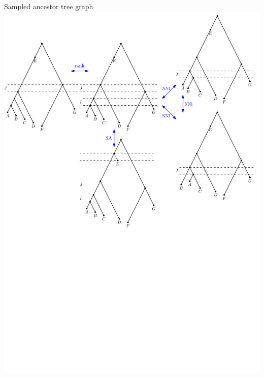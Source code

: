 \documentclass{beamer}
\begin{document}
\begin{frame}
\begin{block}{Sampled ancestor tree graph}
\includegraphics[width=0.8\framewidth]{SAT}
\end{block}
\end{frame}
\end{document}
